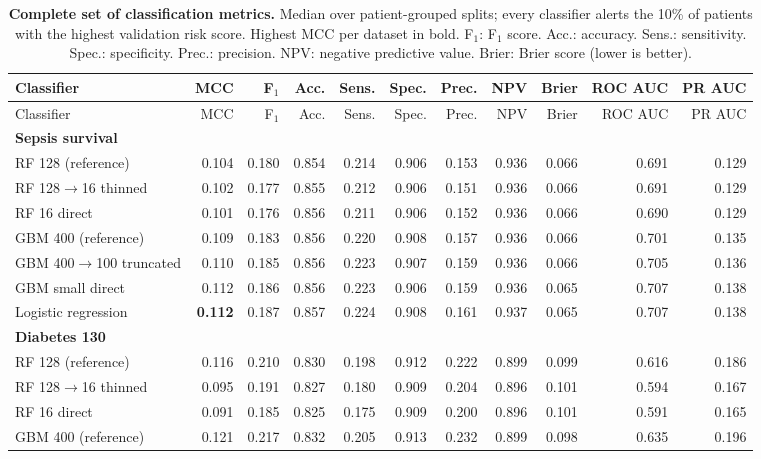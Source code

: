 {\scriptsize\setlength{\tabcolsep}{3pt}
\begin{longtable}{lrrrrrrrrrr}
\caption{\textbf{Complete set of classification metrics.} Median over patient-grouped splits; every classifier alerts the 10\% of patients with the highest validation risk score. Highest MCC per dataset in bold. F$_1$: F$_1$ score. Acc.: accuracy. Sens.: sensitivity. Spec.: specificity. Prec.: precision. NPV: negative predictive value. Brier: Brier score (lower is better).}\label{tab:METRIC-SUITE}\\
\toprule
Classifier & MCC & F$_1$ & Acc. & Sens. & Spec. & Prec. & NPV & Brier & ROC AUC & PR AUC \\
\midrule
\endfirsthead
\toprule
Classifier & MCC & F$_1$ & Acc. & Sens. & Spec. & Prec. & NPV & Brier & ROC AUC & PR AUC \\
\midrule
\endhead
\multicolumn{11}{l}{\textbf{Sepsis survival}} \\*
\quad RF 128 (reference) & 0.104 & 0.180 & 0.854 & 0.214 & 0.906 & 0.153 & 0.936 & 0.066 & 0.691 & 0.129 \\
\quad RF 128$\rightarrow$16 thinned & 0.102 & 0.177 & 0.855 & 0.212 & 0.906 & 0.151 & 0.936 & 0.066 & 0.691 & 0.129 \\
\quad RF 16 direct & 0.101 & 0.176 & 0.856 & 0.211 & 0.906 & 0.152 & 0.936 & 0.066 & 0.690 & 0.129 \\
\quad GBM 400 (reference) & 0.109 & 0.183 & 0.856 & 0.220 & 0.908 & 0.157 & 0.936 & 0.066 & 0.701 & 0.135 \\
\quad GBM 400$\rightarrow$100 truncated & 0.110 & 0.185 & 0.856 & 0.223 & 0.907 & 0.159 & 0.936 & 0.066 & 0.705 & 0.136 \\
\quad GBM small direct & 0.112 & 0.186 & 0.856 & 0.223 & 0.906 & 0.159 & 0.936 & 0.065 & 0.707 & 0.138 \\
\quad Logistic regression & \textbf{0.112} & 0.187 & 0.857 & 0.224 & 0.908 & 0.161 & 0.937 & 0.065 & 0.707 & 0.138 \\
\midrule
\multicolumn{11}{l}{\textbf{Diabetes 130}} \\*
\quad RF 128 (reference) & 0.116 & 0.210 & 0.830 & 0.198 & 0.912 & 0.222 & 0.899 & 0.099 & 0.616 & 0.186 \\
\quad RF 128$\rightarrow$16 thinned & 0.095 & 0.191 & 0.827 & 0.180 & 0.909 & 0.204 & 0.896 & 0.101 & 0.594 & 0.167 \\
\quad RF 16 direct & 0.091 & 0.185 & 0.825 & 0.175 & 0.909 & 0.200 & 0.896 & 0.101 & 0.591 & 0.165 \\
\quad GBM 400 (reference) & 0.121 & 0.217 & 0.832 & 0.205 & 0.913 & 0.232 & 0.899 & 0.098 & 0.635 & 0.196 \\

\end{longtable}}
